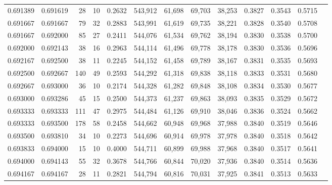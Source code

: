 \begin{tabular}{rrrrrrrrrrrrr}
0.691389 & 0.691619 &    28 &  10 &                                     0.2632 & 543,912 &  61,698 &  69,703 &  38,253 & 0.3827 & 0.3543 & 0.5715 \\
0.691667 & 0.691667 &    79 &  32 &                                     0.2883 & 543,991 &  61,619 &  69,735 &  38,221 & 0.3828 & 0.3540 & 0.5708 \\
0.691667 & 0.692000 &    85 &  27 &                                     0.2411 & 544,076 &  61,534 &  69,762 &  38,194 & 0.3830 & 0.3538 & 0.5700 \\
0.692000 & 0.692143 &    38 &  16 &                                     0.2963 & 544,114 &  61,496 &  69,778 &  38,178 & 0.3830 & 0.3536 & 0.5696 \\
0.692167 & 0.692500 &    38 &  11 &                                     0.2245 & 544,152 &  61,458 &  69,789 &  38,167 & 0.3831 & 0.3535 & 0.5693 \\
0.692500 & 0.692667 &   140 &  49 &                                     0.2593 & 544,292 &  61,318 &  69,838 &  38,118 & 0.3833 & 0.3531 & 0.5680 \\
0.692667 & 0.693000 &    36 &  10 &                                     0.2174 & 544,328 &  61,282 &  69,848 &  38,108 & 0.3834 & 0.3530 & 0.5677 \\
0.693000 & 0.693286 &    45 &  15 &                                     0.2500 & 544,373 &  61,237 &  69,863 &  38,093 & 0.3835 & 0.3529 & 0.5672 \\
0.693333 & 0.693333 &   111 &  47 &                                     0.2975 & 544,484 &  61,126 &  69,910 &  38,046 & 0.3836 & 0.3524 & 0.5662 \\
0.693333 & 0.693500 &   178 &  58 &                                     0.2458 & 544,662 &  60,948 &  69,968 &  37,988 & 0.3840 & 0.3519 & 0.5646 \\
0.693500 & 0.693810 &    34 &  10 &                                     0.2273 & 544,696 &  60,914 &  69,978 &  37,978 & 0.3840 & 0.3518 & 0.5642 \\
0.693833 & 0.694000 &    15 &  10 &                                     0.4000 & 544,711 &  60,899 &  69,988 &  37,968 & 0.3840 & 0.3517 & 0.5641 \\
0.694000 & 0.694143 &    55 &  32 &                                     0.3678 & 544,766 &  60,844 &  70,020 &  37,936 & 0.3840 & 0.3514 & 0.5636 \\
0.694167 & 0.694167 &    28 &  11 &                                     0.2821 & 544,794 &  60,816 &  70,031 &  37,925 & 0.3841 & 0.3513 & 0.5633 \\

\end{tabular}

